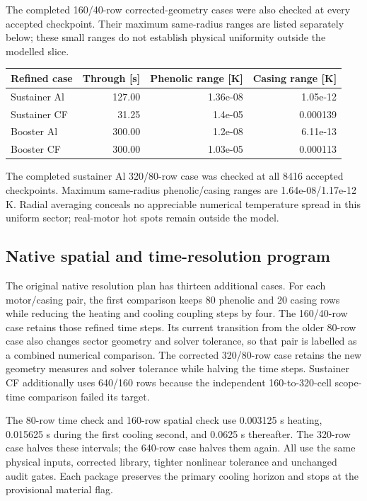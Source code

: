 \documentclass[oneside,openany]{amsdtx}
\begin{document}
The completed 160/40-row corrected-geometry cases were also checked at every accepted checkpoint. Their maximum same-radius ranges are listed separately below; these small ranges do not establish physical uniformity outside the modelled slice.

\begin{table}[H]\centering\scriptsize\begin{tabular}{lrrr}\toprule Refined case & Through [s] & Phenolic range [K] & Casing range [K]\\\midrule

Sustainer Al & 127.00 & 1.36e-08 & 1.05e-12 \\
Sustainer CF & 31.25 & 1.4e-05 & 0.000139 \\
Booster Al & 300.00 & 1.2e-08 & 6.11e-13 \\
Booster CF & 300.00 & 1.03e-05 & 0.000113 \\

\bottomrule\end{tabular}\end{table}

The completed sustainer Al 320/80-row case was checked at all 8416 accepted checkpoints. Maximum same-radius phenolic/casing ranges are 1.64e-08/1.17e-12 K. Radial averaging conceals no appreciable numerical temperature spread in this uniform sector; real-motor hot spots remain outside the model.

\subsection{Native spatial and time-resolution program}

The original native resolution plan has thirteen additional cases. For each motor/casing pair, the first comparison keeps 80 phenolic and 20 casing rows while reducing the heating and cooling coupling steps by four. The 160/40-row case retains those refined time steps. Its current transition from the older 80-row case also changes sector geometry and solver tolerance, so that pair is labelled as a combined numerical comparison. The corrected 320/80-row case retains the new geometry measures and solver tolerance while halving the time steps. Sustainer CF additionally uses 640/160 rows because the independent 160-to-320-cell scope-time comparison failed its target.

The 80-row time check and 160-row spatial check use 0.003125 s heating, 0.015625 s during the first cooling second, and 0.0625 s thereafter. The 320-row case halves these intervals; the 640-row case halves them again. All use the same physical inputs, corrected library, tighter nonlinear tolerance and unchanged audit gates. Each package preserves the primary cooling horizon and stops at the provisional material flag.
\end{document}
